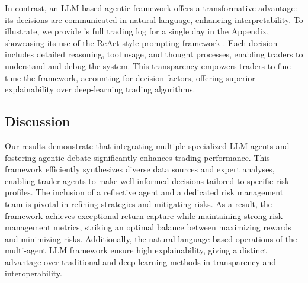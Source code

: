 In contrast, an LLM-based agentic framework offers a transformative advantage: its decisions are communicated in natural language, enhancing interpretability. To illustrate, we provide \model's full trading log for a single day in the Appendix, showcasing its use of the ReAct-style prompting framework \citep{yao2023reactsynergizingreasoningacting}. Each decision includes detailed reasoning, tool usage, and thought processes, enabling traders to understand and debug the system. This transparency empowers traders to fine-tune the framework, accounting for decision factors, offering superior explainability over deep-learning trading algorithms.


\subsection{Discussion}
Our results demonstrate that integrating multiple specialized LLM agents and fostering agentic debate significantly enhances trading performance. This framework efficiently synthesizes diverse data sources and expert analyses, enabling trader agents to make well-informed decisions tailored to specific risk profiles. The inclusion of a reflective agent and a dedicated risk management team is pivotal in refining strategies and mitigating risks. As a result, the framework achieves exceptional return capture while maintaining strong risk management metrics, striking an optimal balance between maximizing rewards and minimizing risks. Additionally, the natural language-based operations of the multi-agent LLM framework ensure high explainability, giving \model a distinct advantage over traditional and deep learning methods in transparency and interoperability.


